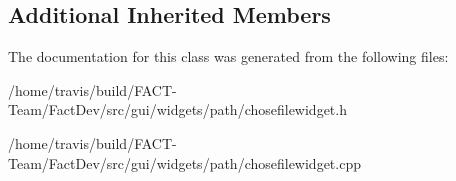 \subsection*{Additional Inherited Members}


The documentation for this class was generated from the following files\-:\begin{DoxyCompactItemize}
\item 
/home/travis/build/\-F\-A\-C\-T-\/\-Team/\-Fact\-Dev/src/gui/widgets/path/chosefilewidget.\-h\item 
/home/travis/build/\-F\-A\-C\-T-\/\-Team/\-Fact\-Dev/src/gui/widgets/path/chosefilewidget.\-cpp\end{DoxyCompactItemize}
